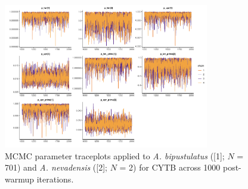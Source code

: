 \documentclass[12pt]{article}
\begin{document}
\newpage

\begin{figure}[H]

\centering

\includegraphics[width=0.80\textwidth]{Figure 2}

\caption{MCMC parameter traceplots applied to \textit{A. bipustulatus} ([1]; $N$ = 701) and \textit{A. nevadensis} ([2]; $N$ = 2) for CYTB across 1000 post-warmup iterations.}

\end{figure}

\newpage
\end{document}

